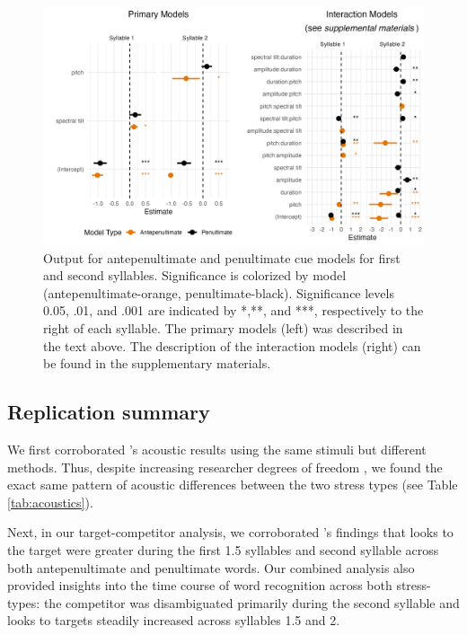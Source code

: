 \begin{figure}[H]
  \centering
    \includegraphics[width=1\linewidth]{visuals/combined_plot_o_n.jpeg} %

  \caption{Output for antepenultimate and penultimate cue models for first and second syllables. Significance is colorized by model (antepenultimate-orange, penultimate-black). Significance levels 0.05, .01, and .001 are indicated by *,**, and ***, respectively to the right of each syllable. The primary models (left) was described in the text above. The description of the interaction models (right) can be found in the supplementary materials.}
  \label{fig:analysis_3_plot}
\end{figure}

\subsection{Replication summary}
We first corroborated \cite{Sulpizio_McQueen_2012}'s acoustic results using the same stimuli but different methods. Thus, despite increasing researcher degrees of freedom \citep{Corretta2023}, we found the exact same pattern of acoustic differences between the two stress types (see Table \ref{tab:acoustics}).

Next, in our target-competitor analysis, we corroborated \cite{Sulpizio_McQueen_2012}'s findings that looks to the target were greater during the first 1.5 syllables and second syllable across both antepenultimate and penultimate words. Our combined analysis also provided insights into the time course of word recognition across both stress-types: the competitor was disambiguated primarily during the second syllable and looks to targets steadily increased across syllables 1.5 and 2.

